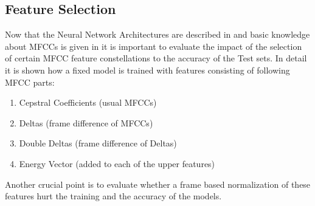 
\subsection{Feature Selection}
Now that the Neural Network Architectures are described in  and basic knowledge about MFCCs is given in  it is important to evaluate the impact of the selection of certain MFCC feature constellations to the accuracy of the Test sets.
In detail it is shown how a fixed model is trained with features consisting of following MFCC parts:
\begin{enumerate}
    \item Cepstral Coefficients (usual MFCCs)
    \item Deltas (frame difference of MFCCs)
    \item Double Deltas (frame difference of Deltas)
    \item Energy Vector (added to each of the upper features)
\end{enumerate}
Another crucial point is to evaluate whether a frame based normalization of these features hurt the training and the accuracy of the models.



